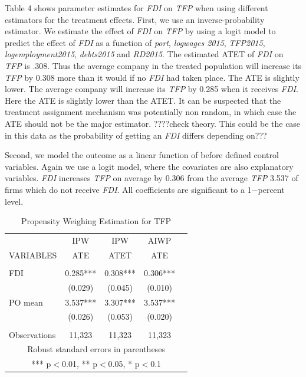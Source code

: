 \documentclass[a4paper,12pt]{scrartcl}
\begin{document}
\newpage
Table 4 shows parameter estimates for \textit{FDI}  on  \textit{TFP} when using different  estimators for the treatment effects. First, we use an inverse-probability estimator. We estimate the effect of \textit{FDI}  on \textit{TFP} by using a logit model to predict the effect of \textit{FDI} as a function of \textit{port}, \textit{logwages 2015}, \textit{TFP2015}, \textit{logemployment2015}, \textit{debts2015} and \textit{RD2015}. The estimated ATET of \textit{FDI}  on \textit{TFP} is .308. Thus the average company in the treated population will increase its \textit{TFP} by 0.308  more than it would if no \textit{FDI}  had taken place. The ATE is slightly lower. The average company will increase its \textit{TFP} by 0.285 when it receives \textit{FDI}. Here the ATE is slightly lower than the ATET. It can be suspected that the treatment assignment mechanism was potentially non random, in which case the ATE should not be the major estimator. ????check theory. This could be the case in this data as the probability of getting an \textit{FDI}  differs depending on???

Second, we model the outcome as a linear function of before defined control variables. Again we use a logit model, where the covariates are also explanatory variables. \textit{FDI} increases \textit{TFP} on average by 0.306 from the average  \textit{TFP} 3.537 of firms which do not receive \textit{FDI}. All coefficients are significant to a 1$-$percent level. 

\begin{table}[htbp]\centering
\caption{Propensity Weighing Estimation for TFP}
\begin{tabular}{lcccc} \hline
 & IPW  & IPW & AIWP \\
VARIABLES & ATE  & ATET  & ATE & \\ \hline
 &  &  &  \\
FDI & 0.285***  & 0.308*** &   0.306***   \\
 
 & (0.029)  & (0.045)  & (0.010)   \\

 


PO mean &3.537***  &   3.307*** & 3.537***  \\

 &   (0.026) & (0.053) & (0.020) \\
 &  &  &    \\
 Observations & 11,323 & 11,323 & 11,323  \\ \hline
\multicolumn{5}{c}{ Robust standard errors in parentheses} \\
\multicolumn{5}{c}{ *** p$<$0.01, ** p$<$0.05, * p$<$0.1} \\
\end{tabular}
\end{table}
\end{document}
